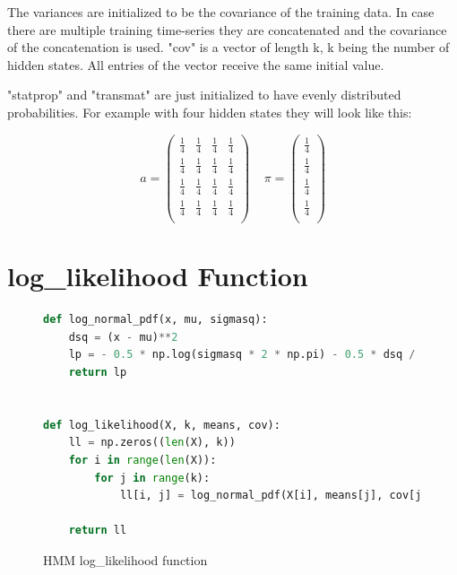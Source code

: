 The variances are initialized to be the covariance of the training data. In case there are multiple training time-series they are concatenated and the covariance of the concatenation is used. "cov" is a vector of length k, k being the number of hidden states. All entries of the vector receive the same initial value. 

"statprop" and "transmat" are just initialized to have evenly distributed probabilities. For example with four hidden states they will look like this: 

\begin{equation}
a = 
\begin{pmatrix}
\frac{1}{4} & \frac{1}{4} & \frac{1}{4} & \frac{1}{4} \\
\frac{1}{4} & \frac{1}{4} & \frac{1}{4} & \frac{1}{4} \\
\frac{1}{4} & \frac{1}{4} & \frac{1}{4} & \frac{1}{4} \\
\frac{1}{4} & \frac{1}{4} & \frac{1}{4} & \frac{1}{4} \\
\end{pmatrix}
\;\;\;\;
\pi = 
\begin{pmatrix}
\frac{1}{4}  \\
\frac{1}{4}  \\
\frac{1}{4}  \\
\frac{1}{4}  \\
\end{pmatrix}
\end{equation}

\section{log\_likelihood Function}

\begin{figure}
\begin{singlespace}
\begin{lstlisting}[language=Python]
def log_normal_pdf(x, mu, sigmasq):
    dsq = (x - mu)**2
    lp = - 0.5 * np.log(sigmasq * 2 * np.pi) - 0.5 * dsq / sigmasq
    return lp


def log_likelihood(X, k, means, cov):
    ll = np.zeros((len(X), k))
    for i in range(len(X)):
        for j in range(k):
            ll[i, j] = log_normal_pdf(X[i], means[j], cov[j])

    return ll
\end{lstlisting}
\end{singlespace}
   
\caption{HMM log\_likelihood function}    
\label{fig:hmm-ll-listing}
\end{figure}

